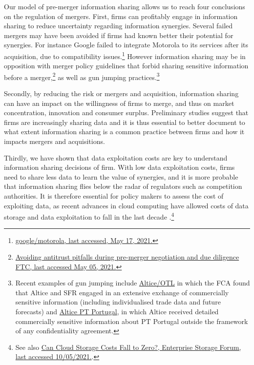 \documentclass[a4paper,leqno]{article}%
\begin{document}
Our model of pre-merger information sharing allows us to reach four conclusions on the regulation of mergers. First, firms can profitably engage in information sharing to reduce uncertainty regarding information synergies. Several failed mergers may have been avoided if firms had known better their potential for synergies. For instance Google failed to integrate Motorola to its services after its acquisition, due to compatibility issues.\footnote{\href{https://salessynergy.net/the-biggest-acquisition-disasters-that-put-companies-into-quite-a-bit-of-trouble/}{google/motorola, last accessed, May 17, 2021.}} However information sharing may be in opposition with merger policy guidelines that forbid sharing sensitive information before a merger,\footnote{\href{https://www.ftc.gov/news-events/blogs/competition-matters/2018/03/avoiding-antitrust-pitfalls-during-pre-merger}{Avoiding antitrust pitfalls during pre-merger negotiation and due diligence FTC, last accessed May 05, 2021.}} as well as gun jumping practices.\footnote{Recent examples of gun jumping include \href{https://sites-herbertsmithfreehills.vuturevx.com/46/12874/compose-email/the-altice-case-a-costly-warning-not-to-engage-in-gun-jumping-before-receiving-merger-control-clearance.asp}{Altice/OTL} in which the FCA found that Altice and SFR engaged in an extensive exchange of commercially sensitive information (including individualised trade data and future forecasts) and \href{https://ec.europa.eu/commission/presscorner/detail/en/IP_18_3522}{Altice PT Portugal}, in which Altice received detailed commercially sensitive information about PT Portugal outside the framework of any confidentiality agreement.}


Secondly, by reducing the risk or mergers and acquisition, information sharing can have an impact on the willingness of firms to merge, and thus on market concentration, innovation and consumer surplus. Preliminary studies suggest that firms are increasingly sharing data \citep{scaria2018study} and it is thus essential to better document to what extent information sharing is a common practice between firms and how it impacts mergers and acquisitions.

Thirdly, we have shown that data exploitation costs are key to understand information sharing decisions of firm. With low data exploitation costs, firms need to share less data to learn the value of synergies, and it is more probable that information sharing flies below the radar of regulators such as competition authorities. It is therefore essential for policy makers to assess the cost of exploiting data, as recent advances in cloud computing have allowed costs of data storage and data exploitation to fall in the last decade \citep{lambrecht2015can}.\footnote{See also \href{https://www.enterprisestorageforum.com/management/can-cloud-storage-costs-fall-to-zero/}{Can Cloud Storage Costs Fall to Zero?, Enterprise Storage Forum, last accessed 10/05/2021.}.} 
\end{document}
